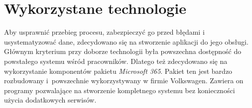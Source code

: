 \section{Wykorzystane technologie}
Aby usprawnić przebieg procesu, zabezpieczyć go przed błędami i usystematyzować dane, zdecydowano się na stworzenie aplikacji do jego obsługi. Głównym kryterium przy doborze technologii była powszechna dostępność do powstałego systemu wśród pracowników. Dlatego też zdecydowano się na wykorzystanie komponentów pakietu \emph{Microsoft 365}. Pakiet ten jest bardzo rozbudowany i~powszechnie wykorzystywany w firmie Volkswagen. Zawiera on programy pozwalające na stworzenie kompletnego systemu bez konieczności użycia dodatkowych serwisów.


